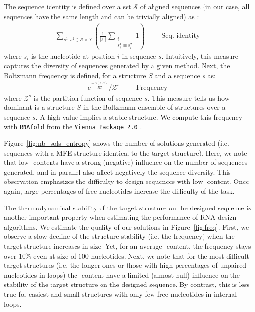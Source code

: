 \documentclass{bioinfo}
\newcommand{\GCContent}{\Gb\Cb-content\xspace}
\newcommand{\rnafold}{\texttt{RNAfold}\xspace}
\newcommand{\Cb}{{\sf{C}}\xspace}
\newcommand{\Gb}{{\sf{G}}\xspace}
\newcommand{\ES}{{{E}}}
\newcommand{\Struct}{{S}}
\begin{document}
The sequence identity is defined over a set $\mathcal{S}$ of aligned sequences (in our case, all sequences have the same length and can be trivially aligned) as :
\begin{align}
  \sum_{s^1,s^2 \in\mathcal{S}\times\mathcal{S}}\left(\frac{1}{|s^1|}{\sum_{\substack{i\\s^1_i\equiv s^2_i}}1}\right) &&& \text{Seq. identity}
\end{align}
where $s_i$ is the nucleotide at position $i$ in sequence $s$. Intuitively, this measure captures the diversity of sequences generated by a given method. Next, the Boltzmann frequency is defined, for a structure $\Struct$ and a sequence $s$ as:
\begin{align}
  e^{\frac{-\ES(s,\Struct)}{RT}}/\mathcal{Z}^s  &&&\text{Frequency}
\end{align}
where $\mathcal{Z}^s$ is the partition function of sequence $s$. This measure tells us how dominant is a structure $\Struct$ in the Boltzmann ensemble of structures over a sequence $s$. A high value implies a stable structure. We compute this frequency with \rnafold from the \texttt{Vienna Package 2.0} \citep{Hofacker:1994}.



Figure~\ref{fig:nb_sols_entropy} shows the number of solutions generated (i.e. sequences with a MFE structure identical to the target structure). Here, we note that low {\GCContent}s have a strong (negative) influence on the number of sequences generated, and in parallel also affect negatively the sequence diversity. This observation emphasizes the difficulty to  design sequences with low \GCContent. Once again, large percentages of free nucleotides increase the difficulty of the task. 

The thermodynamical stability of the target structure on the designed sequence is another important property when estimating the performance of RNA design algorithms. We estimate the quality of our solutions in Figure~\ref{fig:freq}. First, we observe a slow decline of the structure stability (i.e. the frequency) when the target structure increases in size. Yet, for an average \GCContent, the frequency stays over $10\%$ even at size of $100$ nucleotides. Next, we note that for the most difficult target structures (i.e. the longer ones or those with high percentages of unpaired nucleotides in loops) the \GCContent have a limited (almost null) influence on the stability of the target structure on the designed sequence. By contrast, this is less true for easiest and small structures with only few free nucleotides in internal loops.
\end{document}

